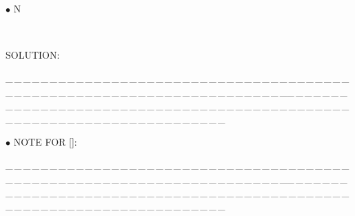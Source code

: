 \documentclass[a4paper, 11pt, UTF8]{article}
\begin{document}
\begin{large}
\par{\tiny\,\par}

{\small $\bullet$}
{\timesbf\Large N} {\timessl\Large 
}\par\quad\,
{\timessl\Large
}\par
{\timesbf S\footnotesize{OLUTION:}}\par\quad

\par
{\tiny \_\,\_\,\_\,\_\,\_\,\_\,\_\,\_\,\_\,\_\,\_\,\_\,\_\,\_\,\_\,\_\,\_\,\_\,\_\,\_\,\_\,\_\,\_\,\_\,\_\,\_\,\_\,\_\,\_\,\_\,\_\,\_\,\_\,\_\,\_\,\_\,\_\,\_\,\_\,\_\,\_\,\_\,\_\,\_\,\_\,\_\,\_\,\_\,\_\,\_\,\_\,\_\,\_\,\_\,\_\,\_\,\_\,\_\,\_\,\_\,\_\,\_\,\_\,\_\,\_\,\_\,\_\,\_\,\_\,\_\,\_\_\,\_\,\_\,\_\,\_\,\_\,\_\,\_\,\_\,\_\,\_\,\_\,\_\,\_\,\_\,\_\,\_\,\_\,\_\,\_\,\_\,\_\,\_\,\_\,\_\,\_\,\_\,\_\,\_\,\_\,\_\,\_\,\_\,\_\,\_\,\_\,\_\,\_\,\_\,\_\,\_\,\_\,\_\,\_\,\_\,\_\,\_\,\_\,\_\,\_\,\_\,\_\,\_\,\_\,\_\,\_\,\_\,\_\,\_\,\_\,\_\,\_\,\_\,\_\,\_\,\_\,\_\,\_\,\_\,\_\,\_}\par

{\small $\bullet$} {\timesbf\Large N{\normalsize OTE} F{\normalsize OR} []:}
\par
{\tiny \_\,\_\,\_\,\_\,\_\,\_\,\_\,\_\,\_\,\_\,\_\,\_\,\_\,\_\,\_\,\_\,\_\,\_\,\_\,\_\,\_\,\_\,\_\,\_\,\_\,\_\,\_\,\_\,\_\,\_\,\_\,\_\,\_\,\_\,\_\,\_\,\_\,\_\,\_\,\_\,\_\,\_\,\_\,\_\,\_\,\_\,\_\,\_\,\_\,\_\,\_\,\_\,\_\,\_\,\_\,\_\,\_\,\_\,\_\,\_\,\_\,\_\,\_\,\_\,\_\,\_\,\_\,\_\,\_\,\_\,\_\_\,\_\,\_\,\_\,\_\,\_\,\_\,\_\,\_\,\_\,\_\,\_\,\_\,\_\,\_\,\_\,\_\,\_\,\_\,\_\,\_\,\_\,\_\,\_\,\_\,\_\,\_\,\_\,\_\,\_\,\_\,\_\,\_\,\_\,\_\,\_\,\_\,\_\,\_\,\_\,\_\,\_\,\_\,\_\,\_\,\_\,\_\,\_\,\_\,\_\,\_\,\_\,\_\,\_\,\_\,\_\,\_\,\_\,\_\,\_\,\_\,\_\,\_\,\_\,\_\,\_\,\_\,\_\,\_\,\_\,\_}\par


\end{large}
\end{document}
